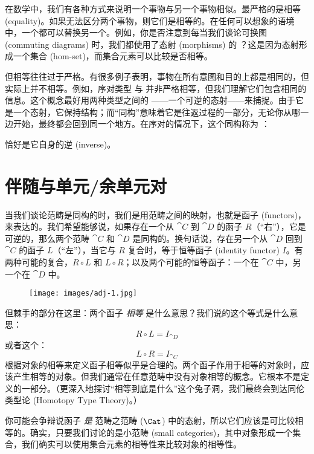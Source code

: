 
\lettrine[lhang=0.17]{在}{数学中，我们有}各种方式来说明一个事物与另一个事物相似。最严格的是相等 (equality)。如果无法区分两个事物，则它们是相等的。在任何可以想象的语境中，一个都可以替换另一个。例如，你是否注意到每当我们谈论可换图 (commuting diagrams) 时，我们都使用了态射 (morphisms) 的 ？这是因为态射形成一个集合 (hom-set)，而集合元素可以比较是否相等。

但相等往往过于严格。有很多例子表明，事物在所有意图和目的上都是相同的，但实际上并不相等。例如，序对类型  与  并非严格相等，但我们理解它们包含相同的信息。这个概念最好用两种类型之间的 ——一个可逆的态射——来捕捉。由于它是一个态射，它保持结构；而“同构”意味着它是往返过程的一部分，无论你从哪一边开始，最终都会回到同一个地方。在序对的情况下，这个同构称为 ：

 恰好是它自身的逆 (inverse)。

\section{伴随与单元/余单元对}

当我们谈论范畴是同构的时，我们是用范畴之间的映射，也就是函子 (functors)，来表达的。我们希望能够说，如果存在一个从 $\cat{C}$ 到 $\cat{D}$ 的函子 $R$（“右”），它是可逆的，那么两个范畴 $\cat{C}$ 和 $\cat{D}$ 是同构的。换句话说，存在另一个从 $\cat{D}$ 回到 $\cat{C}$ 的函子 $L$（“左”），当它与 $R$ 复合时，等于恒等函子 (identity functor) $I$。有两种可能的复合，$R \circ L$ 和 $L \circ R$；以及两个可能的恒等函子：一个在 $\cat{C}$ 中，另一个在 $\cat{D}$ 中。

\begin{figure}[H]
  \centering
  \texttt{[image: images/adj-1.jpg]}
\end{figure}

\noindent
但棘手的部分在这里：两个函子 \emph{相等} 是什么意思？我们说的这个等式是什么意思：
\[R \circ L = I_{\cat{D}}\]
或者这个：
\[L \circ R = I_{\cat{C}}\]
根据对象的相等来定义函子相等似乎是合理的。两个函子作用于相等的对象时，应该产生相等的对象。但我们通常在任意范畴中没有对象相等的概念。它根本不是定义的一部分。（更深入地探讨“相等到底是什么”这个兔子洞，我们最终会到达同伦类型论 (Homotopy Type Theory)。）

你可能会争辩说函子 \emph{是} 范畴之范畴 ($\Cat$) 中的态射，所以它们应该是可比较相等的。确实，只要我们讨论的是小范畴 (small categories)，其中对象形成一个集合，我们确实可以使用集合元素的相等性来比较对象的相等性。

